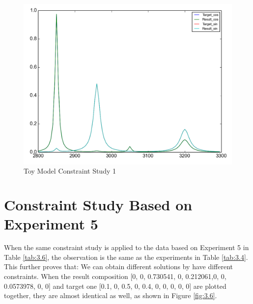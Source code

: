 \begin{figure}[!ht] 
\centering
\includegraphics[scale=0.3]{Figures/toy_model_result_plotting_ir_sin_4candi_constraint_study_experiment4.png} 
\caption{Toy Model Constraint Study 1}\label{fig:3.5}
\end{figure}


\section{Constraint Study Based on Experiment 5}

When the same constraint study is applied to the data based on Experiment 5 in Table \ref{tab:3.6}, the observation is the same as the experiments in Table \ref{tab:3.4}. This further proves that: We can obtain different solutions by have different constraints. When the  result composition [0, 0, 0.730541, 0, 0.212061,0, 0, 0.0573978, 0, 0] and target one [0.1, 0, 0.5, 0, 0.4, 0, 0, 0, 0, 0] are plotted together, they are almost identical as well, as shown in Figure \ref{fig:3.6}.

